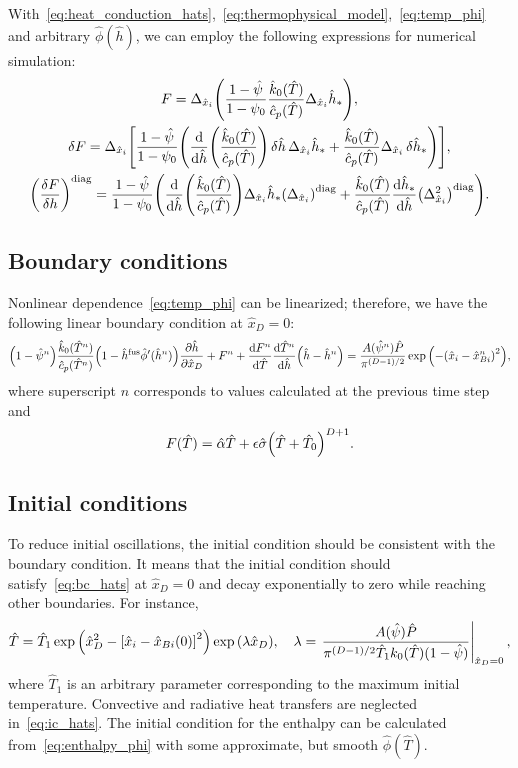 \documentclass{article}
\newcommand{\dder}[2][]{\Delta_{#2}#1}
\newcommand{\diag}[1]{\qty(#1)^\mathrm{diag}}
\newcommand{\fusion}[1]{{#1}^\mathrm{fus}}
\newcommand{\Hx}{\hat{x}}
\newcommand{\Hh}{\hat{h}}
\newcommand{\HT}{\hat{T}}
\newcommand{\HP}{\hat{P}}
\newcommand{\Halpha}{\hat{\alpha}}
\newcommand{\Hsigma}{\hat{\sigma}}
\newcommand{\Hc}{\hat{c}}
\newcommand{\Hk}{\hat{k}}
\newcommand{\Hphi}{\hat{\phi}}
\newcommand{\Hpsi}{\hat{\psi}}
\begin{document}
With~\eqref{eq:heat_conduction_hats},~\eqref{eq:thermophysical_model},~\eqref{eq:temp_phi}
and arbitrary \(\Hphi(\Hh)\), we can employ the following expressions for numerical simulation:
\begin{gather}
    F = \dder{\Hx_i}\qty(
        \frac{1 - \Hpsi}{1 - \psi_0} \frac{\Hk_0(\HT)}{\Hc_p(\HT)} \dder[\Hh_*]{\Hx_i}
	), \\
    \var{F} = \dder{\Hx_i}\qty[ \frac{1 - \Hpsi}{1 - \psi_0} \qty(
	    \dv{\Hh}(\frac{\Hk_0(\HT)}{\Hc_p(\HT)})\var{\Hh}\dder[\Hh_*]{\Hx_i} +
	    \frac{\Hk_0(\HT)}{\Hc_p(\HT)} \dder[\var{\Hh_*}]{\Hx_i}
	)], \\
    \diag{\fdv{F}{h}} = \frac{1 - \Hpsi}{1 - \psi_0} \qty(
	    \dv{\Hh}(\frac{\Hk_0(\HT)}{\Hc_p(\HT)})\dder[\Hh_*]{\Hx_i} \diag{\dder{\Hx_i}} +
	    \frac{\Hk_0(\HT)}{\Hc_p(\HT)}\dv{\Hh_*}{\Hh} \diag{\dder{\Hx_i}^2}
	).
\end{gather}

\subsection{Boundary conditions}

Nonlinear dependence~\eqref{eq:temp_phi} can be linearized; therefore, we have the following linear boundary condition at \(\Hx_D=0\):
\begin{equation}\label{eq:bc_linearized}
    \qty(1 - \Hpsi^n) \frac{\Hk_0(\HT^n)}{\Hc_p(\HT^n)} \qty(1-\fusion{\Hh}\hat\phi'(\Hh^n))\pdv{\Hh}{\Hx_D} +
	    F^n + \dv{F^n}{\HT}\dv{\HT^n}{\Hh}\qty(\Hh - \Hh^n) =
	    \frac{A(\Hpsi^n)\HP}{\pi^{(D-1)/2}}\exp\qty( -\qty(\Hx_i-\Hx_{Bi}^n)^2 ),
\end{equation}
where superscript \(n\) corresponds to values calculated at the previous time step and
\begin{equation}\label{eq:bc_Dirichlet_part}
    F(\HT) = \Halpha\HT + \epsilon\Hsigma\qty(\HT + \HT_0)^{D+1}.
\end{equation}

\subsection{Initial conditions}

To reduce initial oscillations, the initial condition should be consistent with the boundary condition.
It means that the initial condition should satisfy~\eqref{eq:bc_hats} at \(\Hx_D=0\)
and decay exponentially to zero while reaching other boundaries.
For instance,
\begin{equation}\label{eq:ic_hats}
    \HT = \HT_1\exp\qty( \Hx_D^2 - \qty[\Hx_i-\Hx_{Bi}(0)]^2 ) \exp\qty(\lambda \Hx_D), \quad
    \lambda = \eval{ \frac{A(\Hpsi)\HP}{\pi^{(D-1)/2}\HT_1 k_0(\HT)(1-\Hpsi)} }_{\Hx_D=0},
\end{equation}
where \(\HT_1\) is an arbitrary parameter corresponding to the maximum initial temperature.
Convective and radiative heat transfers are neglected in~\eqref{eq:ic_hats}.
The initial condition for the enthalpy can be calculated from~\eqref{eq:enthalpy_phi}
with some approximate, but smooth \(\Hphi(\HT)\).
\end{document}
